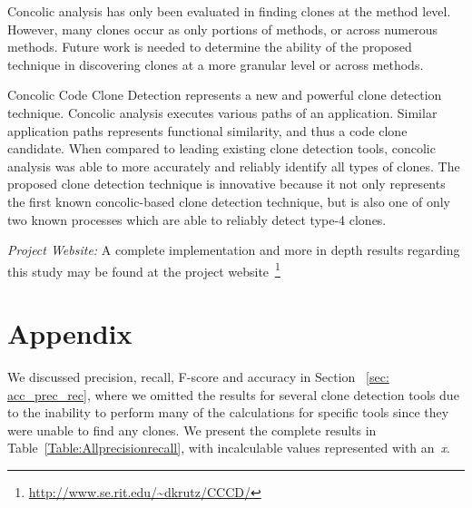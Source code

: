 \documentclass[smallextended]{svjour3}       %
\begin{document}
Concolic analysis has only been evaluated in finding clones at the method level. However, many clones occur as only portions of methods, or across numerous methods. Future work is needed to determine the ability of the proposed technique in discovering clones at a more granular level or across methods.

Concolic Code Clone Detection represents a new and powerful clone detection technique. Concolic analysis executes various paths of an application. Similar application paths represents functional similarity, and thus a code clone candidate. When compared to leading existing clone detection tools, concolic analysis was able to more accurately and reliably identify all types of clones. The proposed clone detection technique is innovative because it not only represents the first known concolic-based clone detection technique, but is also one of only two known processes which are able to reliably detect type-4 clones.


\emph{Project Website:}
A complete implementation and more in depth results regarding this study may be found at the project website~\footnote{\url{http://www.se.rit.edu/~dkrutz/CCCD/}}




%




\appendix
\section{Appendix}

We discussed precision, recall, F-score and accuracy in Section ~\ref{sec: acc_prec_rec}, where we omitted the results for several clone detection tools due to the inability to perform many of the calculations for specific tools since they were unable to find any clones. We present the complete results in Table~\ref{Table:Allprecisionrecall}, with incalculable values represented with an~\emph{x}.
\end{document}
